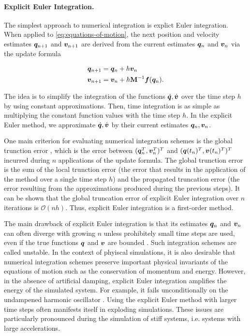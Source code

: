 \paragraph{Explicit Euler Integration.}
The simplest approach to numerical integration is explict Euler integration. 
When applied to \autoref{eq:equations-of-motion}, the next position and velocity estimates $\bm{q}_{n+1}$ and $\bm{v}_{n+1}$ are derived 
from the current estimates $\bm{q}_n$ and $\bm{v}_n$ via the update formula

\begin{align*}
    \bm{q}_{n+1} &= \bm{q}_n + h\bm{v}_n\\
    \bm{v}_{n+1} &= \bm{v}_n + h\mathbf{M}^{-1}\bm{f}(\bm{q}_n).
\end{align*}

\noindent The idea is to simplify the integration of the functions $\dot{\bm{q}}, \dot{\bm{v}}$ over the time step $h$ by using constant 
approximations. Then, time integration is as simple as multiplying the constant function values 
with the time step $h$. In the explicit Euler method, we approximate $\dot{\bm{q}}, \dot{\bm{v}}$ by their current estimates $\bm{q}_n , 
\bm{v}_n$.

One main criterion for evaluating numerical integration schemes is the global trunction error \cite{chapra2005}, which is the error between 
$(\bm{q}^T_n, \bm{v}^T_n)^T$ and $(\bm{q}(t_n)^T, \bm{v}(t_n)^T)^T$ incurred during $n$ applications of the update formula. The global 
trunction error is the sum 
of the local trunction error (the error that results in the application of the method over a single time step $h$) and the propagated truncation 
error (the
error resulting from the approximations produced during the previous steps). It can be shown that the global truncation error of explicit Euler 
integration over $n$ iterations is $\mathcal{O}(nh)$. Thus, explicit Euler integration is a first-order method. 

The main drawback of explicit Euler integration is that its estimates $\bm{q}_n$ and $\bm{v}_n$ can often diverge with growing $n$ unless 
prohibitely small time steps are used, even if the true functions $\bm{q}$ and $\bm{v}$ are bounded \cite{chapra2005}. Such integration schemes 
are called unstable. In the context of phyiscal simulations, it is also desirable that numerical integration schemes preserve important physical 
invariants of the equations of motion such as the conservation of momentum and energy. However, in the absence of artificial damping, explicit
Euler integration amplifies the energy of the simulated system. For example, it fails unconditionally on the undampened harmonic oscillator 
\cite{servin2006}. Using the explicit Euler method with larger time steps often manifests itself in exploding
simulations. These issues are particularly pronounced during the simulation of stiff systems, i.e. systems with large accelerations.

